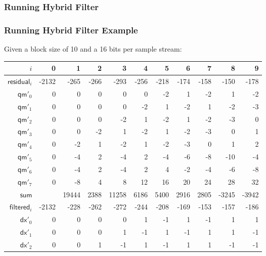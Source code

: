 \clearpage

\subsubsection{Running Hybrid Filter}
\label{tta:hybridfilter}
{
  
}

\clearpage

\subsubsection{Running Hybrid Filter Example}
Given a \textsf{block size} of 10 and a 16 bits per sample stream:
\begin{table}[h]
  {
    \begin{tabular}{r|rrrrrrrrrr}
      $i$ & 0 & 1 & 2 & 3 & 4 & 5 & 6 & 7 & 8 & 9 \\
      \hline
      $\textsf{residual}_i$ & -2132 & -265 & -266 & -293 & -256 & -218 & -174 & -158 & -150 & -178 \\
      \hline
      $\textsf{qm}'_{0}$ & 0 & 0 & 0 & 0 & 0 & -2 & 1 & -2 & 1 & -2 \\
      $\textsf{qm}'_{1}$ & 0 & 0 & 0 & 0 & -2 & 1 & -2 & 1 & -2 & -3 \\
      $\textsf{qm}'_{2}$ & 0 & 0 & 0 & -2 & 1 & -2 & 1 & -2 & -3 & 0 \\
      $\textsf{qm}'_{3}$ & 0 & 0 & -2 & 1 & -2 & 1 & -2 & -3 & 0 & 1 \\
      $\textsf{qm}'_{4}$ & 0 & -2 & 1 & -2 & 1 & -2 & -3 & 0 & 1 & 2 \\
      $\textsf{qm}'_{5}$ & 0 & -4 & 2 & -4 & 2 & -4 & -6 & -8 & -10 & -4 \\
      $\textsf{qm}'_{6}$ & 0 & -4 & 2 & -4 & 2 & 4 & -2 & -4 & -6 & -8 \\
      $\textsf{qm}'_{7}$ & 0 & -8 & 4 & 8 & 12 & 16 & 20 & 24 & 28 & 32 \\
      \hline
      $\textsf{sum}$ &  & 19444 & 2388 & 11258 & 6186 & 5400 & 2916 & 2805 & -3245 & -3942 \\
      \hline
      $\textsf{filtered}_i$ & -2132 & -228 & -262 & -272 & -244 & -208 & -169 & -153 & -157 & -186 \\
      \hline
      $\textsf{dx}'_{0}$ & 0 & 0 & 0 & 0 & 1 & -1 & 1 & -1 & 1 & 1 \\
      $\textsf{dx}'_{1}$ & 0 & 0 & 0 & 1 & -1 & 1 & -1 & 1 & 1 & -1 \\
      $\textsf{dx}'_{2}$ & 0 & 0 & 1 & -1 & 1 & -1 & 1 & 1 & -1 & -1 \\

\end{tabular}}
\end{table}
